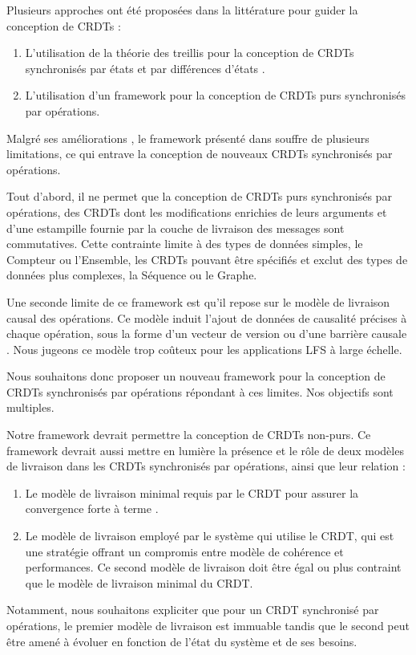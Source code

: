 Plusieurs approches ont été proposées dans la littérature pour guider la conception de \acp{CRDT} :
\begin{enumerate}
    \item L'utilisation de la théorie des treillis pour la conception de \acp{CRDT} synchronisés par états et par différences d'états \cite{shapiro_2011_crdt,enes2019}.
    \item L'utilisation d'un framework \cite{baquero2017pure} pour la conception de \acp{CRDT} purs synchronisés par opérations.
\end{enumerate}

Malgré ses améliorations \cite{2020-flec-bauwens,2021-improving-reactivity-pure-op-based-crdts-bauwens}, le framework présenté dans \cite{baquero2017pure} souffre de plusieurs limitations, ce qui entrave la conception de nouveaux \acp{CRDT} synchronisés par opérations.

Tout d'abord, il ne permet que la conception de \acp{CRDT} purs synchronisés par opérations, \ie des \acp{CRDT} dont les modifications enrichies de leurs arguments et d'une estampille fournie par la couche de livraison des messages sont commutatives.
Cette contrainte limite à des types de données simples, \eg le Compteur ou l'Ensemble, les \acp{CRDT} pouvant être spécifiés et exclut des types de données plus complexes, \eg la Séquence ou le Graphe.

Une seconde limite de ce framework est qu'il repose sur le modèle de livraison causal des opérations.
Ce modèle induit l'ajout de données de causalité précises à chaque opération, sous la forme d'un vecteur de version \cite{1988-version-vector-mattern,1991-version-vector-fidge} ou d'une barrière causale \cite{1997-causal-barrier}.
Nous jugeons ce modèle trop coûteux pour les applications \ac{LFS} à large échelle.

Nous souhaitons donc proposer un nouveau framework pour la conception de \acp{CRDT} synchronisés par opérations répondant à ces limites.
Nos objectifs sont multiples.

Notre framework devrait permettre la conception de \acp{CRDT} non-purs.
Ce framework devrait aussi mettre en lumière la présence et le rôle de deux modèles de livraison dans les \acp{CRDT} synchronisés par opérations, ainsi que leur relation :
\begin{enumerate}
    \item Le modèle de livraison minimal requis par le \ac{CRDT} pour assurer la convergence forte à terme \cite{shapiro_2011_crdt}.
    \item Le modèle de livraison employé par le système qui utilise le \ac{CRDT}, qui est une stratégie offrant un compromis entre modèle de cohérence et performances.
        Ce second modèle de livraison doit être égal ou plus contraint que le modèle de livraison minimal du \ac{CRDT}.
\end{enumerate}
Notamment, nous souhaitons expliciter que pour un \ac{CRDT} synchronisé par opérations, le premier modèle de livraison est immuable tandis que le second peut être amené à évoluer en fonction de l'état du système et de ses besoins.

